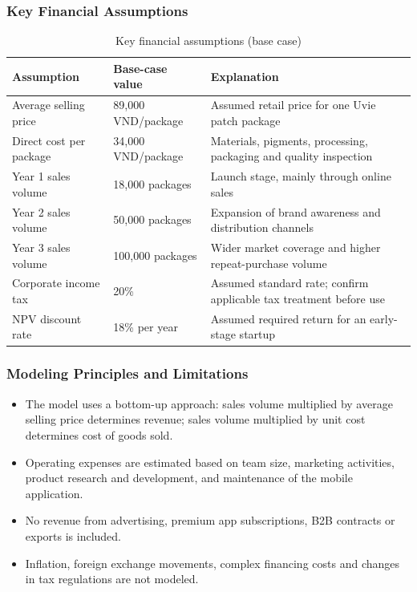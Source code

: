 \subsubsection{Key Financial Assumptions}
\begin{table}[ht]
\centering\small
\caption{Key financial assumptions (base case)}\label{tab:assumptions}
\begin{tabular}{@{}L{4.0cm}L{3.2cm}L{7.0cm}@{}}
  \toprule
  \textbf{Assumption} & \textbf{Base-case value} & \textbf{Explanation}\\
  \midrule
  Average selling price & 89,000 VND/package & Assumed retail price for one Uvie patch package\\
  Direct cost per package & 34,000 VND/package & Materials, pigments, processing, packaging and quality inspection\\
  Year 1 sales volume & 18,000 packages & Launch stage, mainly through online sales\\
  Year 2 sales volume & 50,000 packages & Expansion of brand awareness and distribution channels\\
  Year 3 sales volume & 100,000 packages & Wider market coverage and higher repeat-purchase volume\\
  Corporate income tax & 20\% & Assumed standard rate; confirm applicable tax treatment before use\\
  NPV discount rate & 18\% per year & Assumed required return for an early-stage startup\\
  \bottomrule
\end{tabular}
\end{table}

\subsubsection{Modeling Principles and Limitations}
\begin{itemize}[itemsep=0pt]
  \item The model uses a bottom-up approach: sales volume multiplied by average
    selling price determines revenue; sales volume multiplied by unit cost
    determines cost of goods sold.
  \item Operating expenses are estimated based on team size, marketing
    activities, product research and development, and maintenance of the mobile
    application.
  \item No revenue from advertising, premium app subscriptions, B2B contracts or
    exports is included.
  \item Inflation, foreign exchange movements, complex financing costs and
    changes in tax regulations are not modeled.
\end{itemize}

